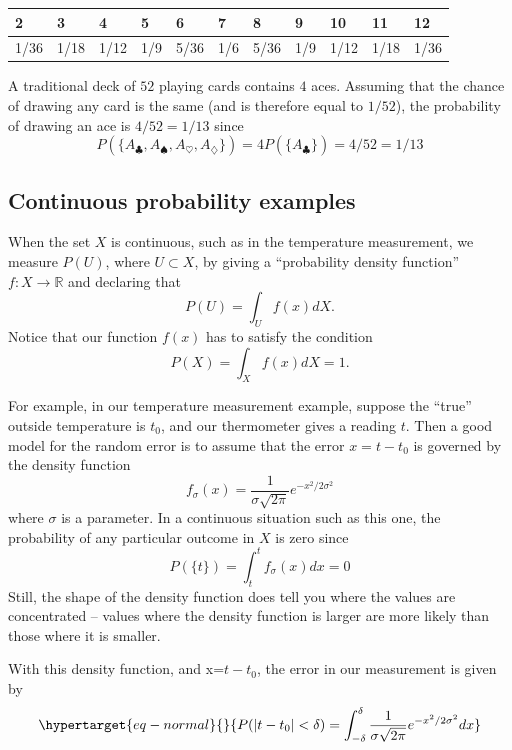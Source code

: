 \documentclass[
  11pt,
  letterpaper,
]{scrbook}
\theoremstyle{plain}
\theoremstyle{plain}
\theoremstyle{remark}
\begin{document}
\begin{longtable}[]{@{}lllllllllll@{}}
\toprule()
2 & 3 & 4 & 5 & 6 & 7 & 8 & 9 & 10 & 11 & 12 \\
\midrule()
\endhead
1/36 & 1/18 & 1/12 & 1/9 & 5/36 & 1/6 & 5/36 & 1/9 & 1/12 & 1/18 &
1/36 \\
\bottomrule()
\end{longtable}

A traditional deck of \(52\) playing cards contains \(4\) aces. Assuming
that the chance of drawing any card is the same (and is therefore equal
to \(1/52\)), the probability of drawing an ace is \(4/52=1/13\) since
\[
P(\{A_{\clubsuit},A_{\spadesuit},A_{\heartsuit},A_{\diamondsuit}\}) = 4P(\{A_{\clubsuit}\})=4/52=1/13
\]

\hypertarget{continuous-probability-examples}{%
\subsection{Continuous probability
examples}\label{continuous-probability-examples}}

When the set \(X\) is continuous, such as in the temperature
measurement, we measure \(P(U)\), where \(U\subset X\), by giving a
``probability density function'' \(f:X\to \mathbb{R}\) and declaring
that \[
P(U) = \int_{U}f(x) dX.
\] Notice that our function \(f(x)\) has to satisfy the condition \[
P(X)=\int_{X} f(x)dX = 1.
\]

For example, in our temperature measurement example, suppose the
``true'' outside temperature is \(t_0\), and our thermometer gives a
reading \(t\). Then a good model for the random error is to assume that
the error \(x=t-t_0\) is governed by the density function \[
f_\sigma(x) = \frac{1}{\sigma\sqrt{2\pi}}e^{-x^2/2\sigma^2}
\] where \(\sigma\) is a parameter. In a continuous situation such as
this one, the probability of any particular outcome in \(X\) is zero
since \[
P(\{t\})=\int_{t}^{t}f_{\sigma}(x)dx = 0
\] Still, the shape of the density function does tell you where the
values are concentrated -- values where the density function is larger
are more likely than those where it is smaller.

With this density function, and x=\(t-t_0\), the error in our
measurement is given by
\begin{equation}\protect\hypertarget{eq-normal}{}{
P(|t-t_0|<\delta)=\int_{-\delta}^{\delta} \frac{1}{\sigma\sqrt{2\pi}}e^{-x^2/2\sigma^2} dx
}\label{eq-normal}\end{equation}
\end{document}
